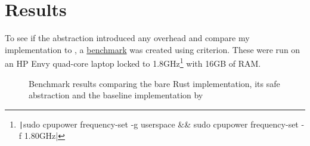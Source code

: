 \documentclass[a4paper]{article} %
\begin{document}


\section{Results}

To see if the abstraction introduced any overhead and compare my implementation to \cite{barnesAcceleratingFluvialIncision2019}, a \href{https://codeberg.org/feefladder/oxscape/src/commit/01d2cf5ef0565bd991f6bd3b2bdc10fa8ffc2f7e/rust/benches/run.rs}{benchmark} was created using criterion. These were run on an HP Envy quad-core laptop locked to 1.8GHz\footnote{\texttt|sudo cpupower frequency-set -g userspace && sudo cpupower frequency-set -f 1.80GHz|} with 16GB of RAM.

\begin{figure}
    \begin{center}
        
    \end{center}
    \caption{Benchmark results comparing the bare Rust implementation, its safe abstraction and the baseline implementation by \cite{barnesAcceleratingFluvialIncision2019}}\label{fig:bench}
\end{figure}
\end{document}
